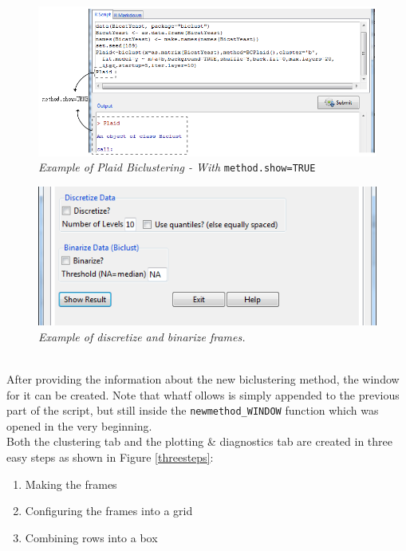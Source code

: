 \documentclass[a4paper]{article}\usepackage[]{graphicx}\usepackage[]{color}
\begin{document}
\begin{figure}[H]
\centering
\includegraphics[scale=0.5]{figures/showmethod.png}
\caption{{\it Example of Plaid Biclustering - With} \texttt{method.show=TRUE}
\label{showmethod}}
\end{figure}
\begin{figure}[H]
\centering
\includegraphics[scale=0.5]{figures/discrbin.png}
\caption{{\it Example of discretize and binarize frames.}
\label{discr.bin}}
\end{figure}

\\
After providing the information about the new biclustering method, the window
for it can be created. Note that whatf ollows is simply appended to the
previous part of the script, but still inside the \verb|newmethod_WINDOW|
function which was opened in the very beginning.\\
Both the clustering tab and the plotting \& diagnostics tab are created
in three easy steps as shown in Figure \ref{threesteps}:
\begin{enumerate}
\item Making the frames
\item Configuring the frames into a grid
\item Combining rows into a box
\end{enumerate}
\end{document}
